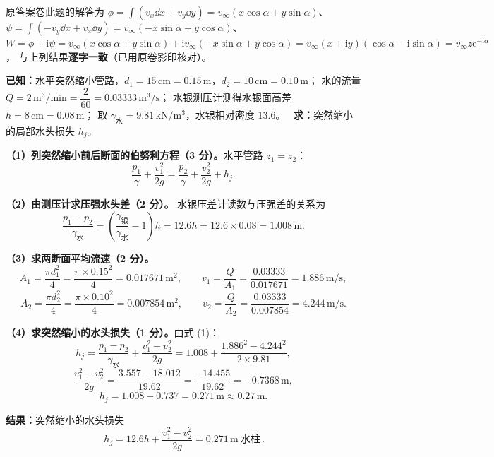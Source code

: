 \begin{tishi}
原答案卷此题的解答为
$\phi=\displaystyle\int(v_x\dd x+v_y\dd y)=v_\infty(x\cos\alpha+y\sin\alpha)$、
$\psi=\displaystyle\int(-v_y\dd x+v_x\dd y)=v_\infty(-x\sin\alpha+y\cos\alpha)$、
$W=\phi+\mathrm{i}\psi=v_\infty(x\cos\alpha+y\sin\alpha)+\mathrm{i}v_\infty(-x\sin\alpha+y\cos\alpha)
=v_\infty(x+\mathrm{i}y)(\cos\alpha-\mathrm{i}\sin\alpha)=v_\infty z\mathrm{e}^{-\mathrm{i}\alpha}$，
与上列结果\textbf{逐字一致}（已用原卷影印核对）。
\end{tishi}


\begin{jie}
\textbf{已知：}水平突然缩小管路，$d_1=15\,\mathrm{cm}=0.15\,\mathrm{m}$，$d_2=10\,\mathrm{cm}=0.10\,\mathrm{m}$；
水的流量 $Q=2\,\mathrm{m^{3}/min}=\dfrac{2}{60}=0.03333\,\mathrm{m^{3}/s}$；
水银测压计测得水银面高差 $h=8\,\mathrm{cm}=0.08\,\mathrm{m}$；
取 $\gamma_{\text{水}}=9.81\,\mathrm{kN/m^{3}}$，水银相对密度 $13.6$。
\ \textbf{求：}突然缩小的局部水头损失 $h_j$。

\textbf{（1）列突然缩小前后断面的伯努利方程（3 分）。}水平管路 $z_1=z_2$：
\[
\frac{p_1}{\gamma}+\frac{v_1^{2}}{2g}
=\frac{p_2}{\gamma}+\frac{v_2^{2}}{2g}+h_j . \tag{1}
\]

\textbf{（2）由测压计求压强水头差（2 分）。}
水银压差计读数与压强差的关系为
\[
\frac{p_1-p_2}{\gamma_{\text{水}}}
=\left(\frac{\gamma_{\text{银}}}{\gamma_{\text{水}}}-1\right)h=12.6h=12.6\times0.08=1.008\,\mathrm{m}.
\]

\textbf{（3）求两断面平均流速（2 分）。}
\[
A_1=\frac{\pi d_1^{2}}{4}=\frac{\pi\times0.15^{2}}{4}=0.017671\,\mathrm{m^{2}},\qquad
v_1=\frac{Q}{A_1}=\frac{0.03333}{0.017671}=1.886\,\mathrm{m/s},
\]
\[
A_2=\frac{\pi d_2^{2}}{4}=\frac{\pi\times0.10^{2}}{4}=0.007854\,\mathrm{m^{2}},\qquad
v_2=\frac{Q}{A_2}=\frac{0.03333}{0.007854}=4.244\,\mathrm{m/s}.
\]

\textbf{（4）求突然缩小的水头损失（1 分）。}由式 (1)：
\[
h_j=\frac{p_1-p_2}{\gamma_{\text{水}}}+\frac{v_1^{2}-v_2^{2}}{2g}
=1.008+\frac{1.886^{2}-4.244^{2}}{2\times9.81},
\]
\[
\frac{v_1^{2}-v_2^{2}}{2g}=\frac{3.557-18.012}{19.62}=\frac{-14.455}{19.62}=-0.7368\,\mathrm{m},
\]
\[
h_j=1.008-0.737=0.271\,\mathrm{m}\approx0.27\,\mathrm{m}.
\]

\textbf{结果：}突然缩小的水头损失
\[
\boxed{\,h_j=12.6h+\frac{v_1^{2}-v_2^{2}}{2g}=0.271\,\mathrm{m}\ \text{水柱}\,}.
\]
\end{jie}

